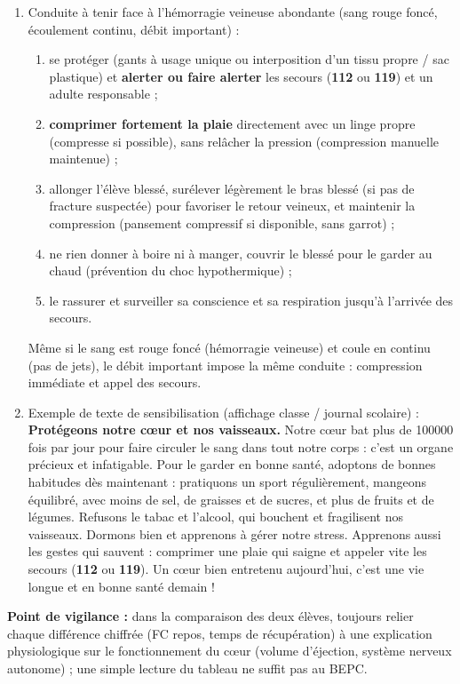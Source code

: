 \documentclass[11pt]{article}
\begin{document}
\begin{corrige}
\begin{enumerate}
\begin{itemize}
\item limiter le stress chronique et dormir suffisamment (\SIrange{7}{9}{\hour} par nuit), car le stress et le manque de sommeil augmentent la tension artérielle et la fréquence cardiaque au repos.
\end{itemize}
\item Conduite à tenir face à l'hémorragie veineuse abondante (sang rouge foncé, écoulement continu, débit important) :
\begin{enumerate}
\item se protéger (gants à usage unique ou interposition d'un tissu propre / sac plastique) et \textbf{alerter ou faire alerter} les secours (\textbf{112} ou \textbf{119}) et un adulte responsable ;
\item \textbf{comprimer fortement la plaie} directement avec un linge propre (compresse si possible), sans relâcher la pression (compression manuelle maintenue) ;
\item allonger l'élève blessé, surélever légèrement le bras blessé (si pas de fracture suspectée) pour favoriser le retour veineux, et maintenir la compression (pansement compressif si disponible, sans garrot) ;
\item ne rien donner à boire ni à manger, couvrir le blessé pour le garder au chaud (prévention du choc hypothermique) ;
\item le rassurer et surveiller sa conscience et sa respiration jusqu'à l'arrivée des secours.
\end{enumerate}
Même si le sang est rouge foncé (hémorragie veineuse) et coule en continu (pas de jets), le débit important impose la même conduite : compression immédiate et appel des secours.
\item Exemple de texte de sensibilisation (affichage classe / journal scolaire) :\\[2mm]
\og \textbf{Protégeons notre cœur et nos vaisseaux.} Notre cœur bat plus de \num{100000} fois par jour pour faire circuler le sang dans tout notre corps : c'est un organe précieux et infatigable. Pour le garder en bonne santé, adoptons de bonnes habitudes dès maintenant : pratiquons un sport régulièrement, mangeons équilibré, avec moins de sel, de graisses et de sucres, et plus de fruits et de légumes. Refusons le tabac et l'alcool, qui bouchent et fragilisent nos vaisseaux. Dormons bien et apprenons à gérer notre stress. Apprenons aussi les gestes qui sauvent : comprimer une plaie qui saigne et appeler vite les secours (\textbf{112} ou \textbf{119}). Un cœur bien entretenu aujourd'hui, c'est une vie longue et en bonne santé demain ! \fg
\end{enumerate}
\textbf{Point de vigilance :} dans la comparaison des deux élèves, toujours relier chaque différence chiffrée (FC repos, temps de récupération) à une explication physiologique sur le fonctionnement du cœur (volume d'éjection, système nerveux autonome) ; une simple lecture du tableau ne suffit pas au BEPC.
\end{corrige}
\end{document}
